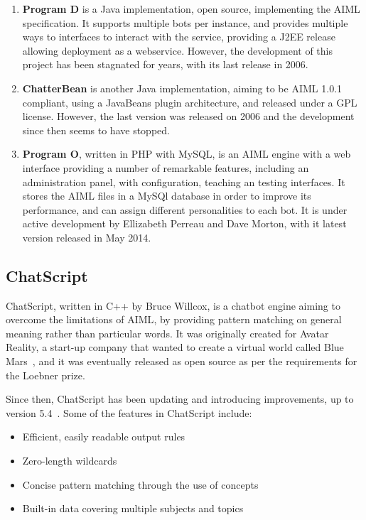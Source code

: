 \begin{enumerate}
 \item \textbf{Program D} is a Java implementation, open source, implementing the \ac{AIML} specification. It supports multiple bots per instance, and provides multiple ways to interfaces to interact with the service, providing a J2EE release allowing deployment as a webservice. However, the development of this project has been stagnated for years, with its last release in 2006.
 \item \textbf{ChatterBean} is another Java implementation, aiming to be \ac{AIML} 1.0.1 compliant, using a JavaBeans plugin architecture, and released under a GPL license. However, the last version was released on 2006 and the development since then seems to have stopped.
 \item \textbf{Program O}, written in PHP with MySQL, is an \ac{AIML} engine with a web interface providing a number of remarkable features, including an administration panel, with configuration, teaching an testing interfaces. It stores the \ac{AIML} files in a MySQl database in order to improve its performance, and can assign different personalities to each bot. It is under active development by Ellizabeth Perreau and Dave Morton, with it latest version released in May 2014. 
\end{enumerate}

\subsection{ChatScript}

ChatScript, written in C++ by Bruce Willcox, is a chatbot engine aiming to overcome the limitations of \ac{AIML}, by providing pattern matching on general meaning rather than particular words. It was originally created for Avatar Reality, a start-up company that wanted to create a virtual world called Blue Mars~\cite{Wilcox2010suzzete}, and it was eventually released as open source as per the requirements for the Loebner prize.

Since then, ChatScript has been updating and introducing improvements, up to version 5.4~\cite{ChatScriptSourceForge}. Some of the features in ChatScript include:
\begin{itemize}
 \item Efficient, easily readable output rules
 \item Zero-length wildcards
 \item Concise pattern matching through the use of concepts
 \item Built-in data covering multiple subjects and topics
\end{itemize}


